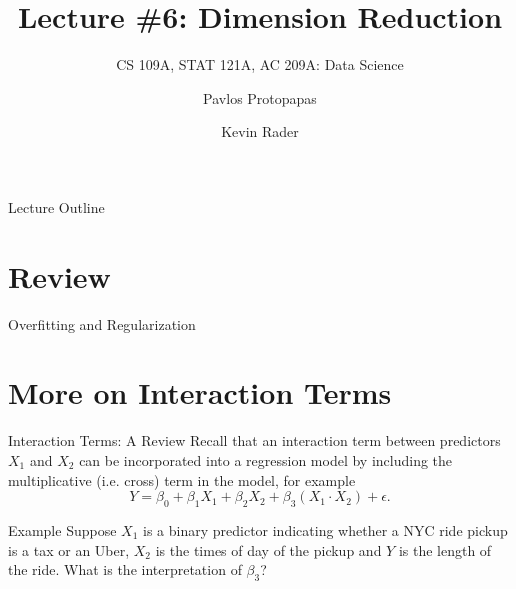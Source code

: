 \documentclass[12pt,t]{beamer}
\begin{document}

\title{\large{Lecture \#6: Dimension Reduction}}
\subtitle{CS 109A, STAT 121A, AC 209A: Data Science}
\author{Pavlos Protopapas \and Kevin Rader}
\date{}
{
\frame{
  \titlepage
  
}
}


\begin{frame}{Lecture Outline}
\tableofcontents
\end{frame}

\section{Review}

\begin{frame}{Overfitting and Regularization} 

\end{frame}

\section{More on Interaction Terms}

\begin{frame}{Interaction Terms: A Review} 
Recall that an interaction term between predictors $X_1$ and $X_2$ can be incorporated into a regression model by including the multiplicative (i.e. cross) term in the model, for example
\[
Y = \beta_0 + \beta_1X_1 + \beta_2X_2 + \beta_3(X_1\cdot X_2) + \epsilon.
\]
\vskip-0.2cm
\begin{block}{Example}
Suppose $X_1$ is a binary predictor indicating whether a NYC ride pickup is a tax or an Uber, $X_2$ is the times of day of the pickup and $Y$ is the length of the ride. 
\vskip0.2cm
What is the interpretation of $\beta_3$?
\end{block}
\end{frame}
\end{document}
